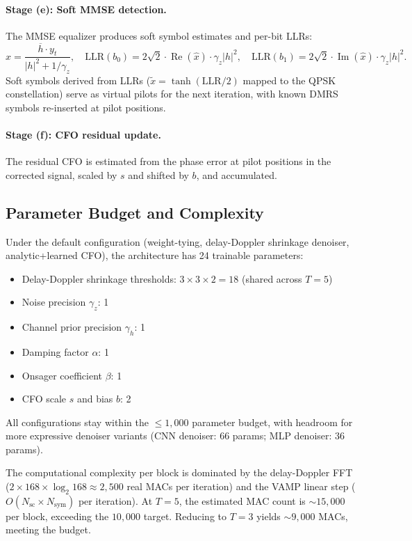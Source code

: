 \documentclass{article}
\begin{document}
\paragraph{Stage (e): Soft MMSE detection.}
The MMSE equalizer produces soft symbol estimates and per-bit LLRs:
\begin{equation}
\hat{x} = \frac{\overline{h} \cdot y_t}{|h|^2 + 1/\gamma_z}, \quad
\mathrm{LLR}(b_0) = 2\sqrt{2} \cdot \operatorname{Re}(\hat{x}) \cdot \gamma_z |h|^2, \quad
\mathrm{LLR}(b_1) = 2\sqrt{2} \cdot \operatorname{Im}(\hat{x}) \cdot \gamma_z |h|^2.
\end{equation}
Soft symbols derived from LLRs ($\tilde{x} = \tanh(\mathrm{LLR}/2)$ mapped to the QPSK constellation) serve as virtual pilots for the next iteration, with known DMRS symbols re-inserted at pilot positions.

\paragraph{Stage (f): CFO residual update.}
The residual CFO is estimated from the phase error at pilot positions in the corrected signal, scaled by $s$ and shifted by $b$, and accumulated.

\subsection{Parameter Budget and Complexity}

Under the default configuration (weight-tying, delay-Doppler shrinkage denoiser, analytic+learned CFO), the architecture has 24 trainable parameters:
\begin{itemize}
  \item Delay-Doppler shrinkage thresholds: $3 \times 3 \times 2 = 18$ (shared across $T=5$)
  \item Noise precision $\gamma_z$: 1
  \item Channel prior precision $\gamma_h$: 1
  \item Damping factor $\alpha$: 1
  \item Onsager coefficient $\beta$: 1
  \item CFO scale $s$ and bias $b$: 2
\end{itemize}
All configurations stay within the $\leq 1{,}000$ parameter budget, with headroom for more expressive denoiser variants (CNN denoiser: 66 params; MLP denoiser: 36 params).

The computational complexity per block is dominated by the delay-Doppler FFT ($2 \times 168 \times \log_2 168 \approx 2{,}500$ real MACs per iteration) and the VAMP linear step ($O(N_{\mathrm{sc}} \times N_{\mathrm{sym}})$ per iteration). At $T=5$, the estimated MAC count is $\sim 15{,}000$ per block, exceeding the $10{,}000$ target. Reducing to $T=3$ yields $\sim 9{,}000$ MACs, meeting the budget.
\end{document}
